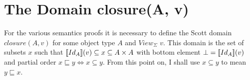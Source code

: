 \documentclass[12pt,a4paper,twoside,openright]{report}
\newcommand{\db}[1]{{\bf [\![}#1{\bf ]\!]}}
\newcommand{\deno}[1]{\db{#1}(v)}
\newcommand{\clos}[0]{closure(A, v)}
\begin{document}
\appendix
{}
\chapter{The Domain \clos}

For the various semantics proofs it is necessary to define the Scott domain $\clos$ for some object type $A$ and $View_{\Sigma}$ $v$. This domain is the set of subsets $x$ such that $\deno{Id_A} \subseteq x \subseteq A \times A$ with bottom element $\bot = \deno{Id_A}$ and partial order $x \sqsubseteq y \Leftrightarrow x \subseteq y$. From this point on, I shall use $x \subseteq y$ to mean $y \sqsubseteq x$.\\\\
\end{document}
